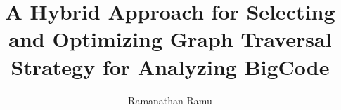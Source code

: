\title{A Hybrid Approach for Selecting and Optimizing Graph Traversal Strategy for Analyzing BigCode}
\author{Ramanathan Ramu}
\notice
\maketitle
